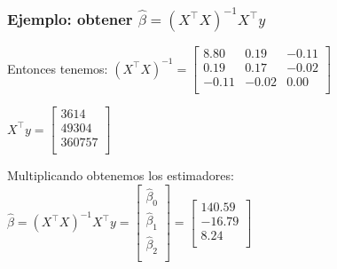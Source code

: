 \documentclass{beamer}
\begin{document}
\begin{frame}
\frametitle{Ejemplo: obtener $\hat{\beta} = (X^\top X)^{-1}X^\top y$}

Entonces tenemos: $(X^{\top}X)^{-1} = 
\begin{bmatrix}
8.80 & 0.19 & -0.11 \\
0.19 & 0.17 & -0.02 \\
-0.11 & -0.02 & 0.00 \\
\end{bmatrix}$

$X^{\top}y = 
\begin{bmatrix}
3614 \\
49304 \\
360757 \\
\end{bmatrix}$

\medskip %

Multiplicando obtenemos los estimadores:
\medskip
$\hat{\beta} = (X^{\top}X)^{-1}X^{\top}y=
\begin{bmatrix}
\hat{\beta}_0 \\
\hat{\beta}_1 \\
\hat{\beta}_2 \\
\end{bmatrix}=
\begin{bmatrix}
140.59 \\
-16.79 \\
8.24 \\
\end{bmatrix}$\\
\medskip
\end{frame}
\end{document}
